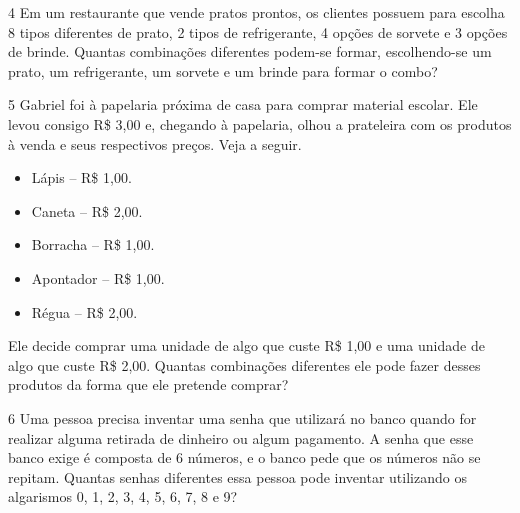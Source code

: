 \begin{mdframed}[linewidth=2pt,linecolor=salmao,roundcorner=2pt]
\begin{escolha}
{\begin{escolha}
\num{4} Em um restaurante que vende pratos prontos, os clientes possuem para
escolha 8 tipos diferentes de prato, 2 tipos de refrigerante, 4 opções
de sorvete e 3 opções de brinde. Quantas combinações diferentes podem-se
formar, escolhendo-se um prato, um refrigerante, um sorvete e um brinde para
formar o combo?

\begin{mdframed}[linewidth=2pt,linecolor=salmao,roundcorner=2pt]
\vspace{2cm}
\end{mdframed}

\num{5} Gabriel foi à papelaria próxima de casa para comprar material
escolar. Ele levou consigo R\$ 3,00 e, chegando à papelaria, olhou a
prateleira com os produtos à venda e seus respectivos preços. Veja a seguir.

\begin{itemize}
  \item Lápis -- R\$ 1,00.
  \item Caneta -- R\$ 2,00.
  \item Borracha -- R\$ 1,00.
  \item Apontador -- R\$ 1,00.
  \item Régua -- R\$ 2,00.
\end{itemize}

Ele decide comprar uma unidade de algo que custe R\$ 1,00 e uma unidade de
algo que custe R\$ 2,00. Quantas combinações diferentes ele pode fazer
desses produtos da forma que ele pretende comprar?

\begin{mdframed}[linewidth=2pt,linecolor=salmao,roundcorner=2pt]



\vspace{2cm}
\end{mdframed}

\num{6} Uma pessoa precisa inventar uma senha que utilizará no banco quando for
realizar alguma retirada de dinheiro ou algum pagamento. A senha que esse
banco exige é composta de 6 números, e o banco pede que os números
não se repitam. Quantas senhas diferentes essa pessoa pode inventar
utilizando os algarismos 0, 1, 2, 3, 4, 5, 6, 7, 8 e 9?


\end{escolha}}
\end{escolha}
\end{mdframed}

